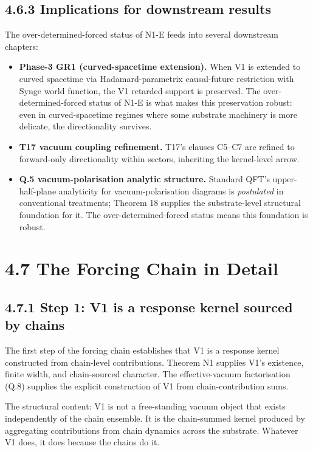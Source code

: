 \documentclass[11pt]{book}
\begin{document}
\subsection{4.6.3 Implications for downstream results}

The over-determined-forced status of N1-E feeds into several downstream chapters:

\begin{itemize}
\item \textbf{Phase-3 GR1 (curved-spacetime extension).} When V1 is extended to curved spacetime via Hadamard-parametrix causal-future restriction with Synge world function, the V1 retarded support is preserved. The over-determined-forced status of N1-E is what makes this preservation robust: even in curved-spacetime regimes where some substrate machinery is more delicate, the directionality survives.
\item \textbf{T17 vacuum coupling refinement.} T17's clauses C5–C7 are refined to forward-only directionality within sectors, inheriting the kernel-level arrow.
\item \textbf{Q.5 vacuum-polarisation analytic structure.} Standard QFT's upper-half-plane analyticity for vacuum-polarisation diagrams is \textit{postulated} in conventional treatments; Theorem 18 supplies the substrate-level structural foundation for it. The over-determined-forced status means this foundation is robust.
\end{itemize}

\section{4.7 The Forcing Chain in Detail}

\subsection{4.7.1 Step 1: V1 is a response kernel sourced by chains}

The first step of the forcing chain establishes that V1 is a response kernel constructed from chain-level contributions. Theorem N1 supplies V1's existence, finite width, and chain-sourced character. The effective-vacuum factorisation (Q.8) supplies the explicit construction of V1 from chain-contribution sums.

The structural content: V1 is not a free-standing vacuum object that exists independently of the chain ensemble. It is the chain-summed kernel produced by aggregating contributions from chain dynamics across the substrate. Whatever V1 does, it does because the chains do it.
\end{document}
